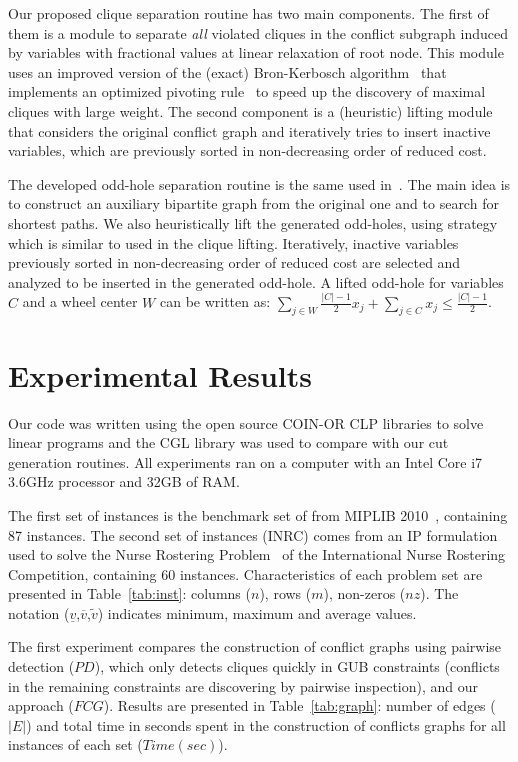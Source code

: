 \documentclass{endm}
\begin{document}
Our proposed clique separation routine has two main components. The first of them is a module to separate \emph{all} violated cliques in the conflict subgraph induced by variables with fractional values at linear relaxation of root node. This module uses an improved version of the (exact) Bron-Kerbosch algorithm~\cite{Bron1973} that implements an optimized pivoting rule~\cite{Brito2011} to speed up the discovery of maximal cliques with large weight. The second component is a (heuristic) lifting module that considers the original conflict graph and iteratively tries to insert inactive variables, which are previously sorted in non-decreasing order of reduced cost. 

The developed odd-hole separation routine is the same used in~\cite{Rebennack2009}. The main idea is to construct an auxiliary bipartite graph from the original one and to search for shortest paths. We also heuristically lift the generated odd-holes, using strategy which is similar to used in the clique lifting. Iteratively, inactive variables previously sorted in non-decreasing order of reduced cost are selected and analyzed to be inserted in the generated odd-hole. A lifted odd-hole for variables $C$ and a wheel center $W$ can be written as: $\displaystyle \sum_{j \in W} \frac{|C|-1}{2} x_{j} + \sum_{j \in C} x_{j} \leq \frac{|C|-1}{2}$.

\section{Experimental Results}\label{experiments}

Our code was written using the open source COIN-OR \cite{LougeeHeimer2003} CLP libraries to solve linear programs and the CGL library was used to compare with our cut generation routines. All experiments ran on a computer with an Intel Core i7 3.6GHz processor and 32GB of RAM.

The first set of instances is the benchmark set of from MIPLIB 2010~\cite{miplib}, containing 87 instances. The second set of instances (INRC) comes from an IP formulation  used to solve the Nurse Rostering Problem~\cite{Santos2014} of the International Nurse Rostering Competition, containing 60 instances. Characteristics of each problem set are presented in Table~\ref{tab:inst}: columns ($n$), rows ($m$), non-zeros ($nz$). The notation ($\underline{v}$,$\overline{v}$,$\tilde{v}$) indicates minimum, maximum and average values.

The first experiment compares the construction of conflict graphs using pairwise detection ($PD$), which only detects cliques quickly in GUB constraints (conflicts in the remaining constraints are discovering by pairwise inspection), and our approach ($FCG$). Results are presented in Table~\ref{tab:graph}: number of edges ($|E|$) and total time in seconds spent in the construction of conflicts graphs for all instances of each set ($Time (sec)$). 
\end{document}
